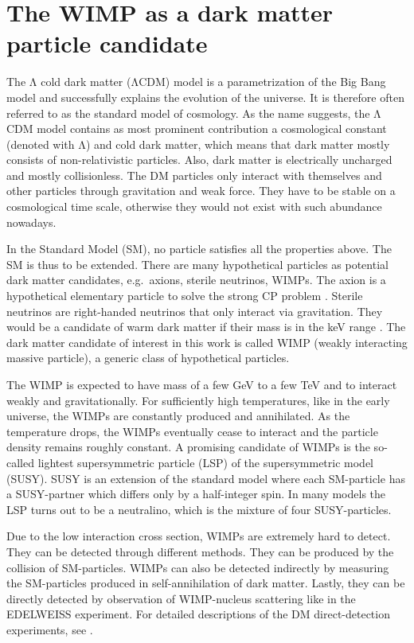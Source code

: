 \section{The WIMP as a dark matter particle candidate}
The $\mathrm{\Lambda}$ cold dark matter ($\mathrm{\Lambda}$CDM) model is a parametrization of the Big Bang model and successfully explains the evolution of the universe. It is therefore often referred to as the standard model of cosmology. As the name suggests, the $\mathrm{\Lambda}$CDM model contains as most prominent contribution a cosmological constant (denoted with $\mathrm{\Lambda}$) and cold dark matter, which means that dark matter mostly consists of non-relativistic particles. Also, dark matter is electrically uncharged and mostly collisionless. The DM particles only interact with themselves and other particles through gravitation and weak force. They have to be stable on a cosmological time scale, otherwise they would not exist with such abundance nowadays.

In the Standard Model (SM), no particle satisfies all the properties above. The SM is thus to be extended. There are many hypothetical particles as potential dark matter candidates, e.g.\ axions, sterile neutrinos, WIMPs. The axion is a hypothetical elementary particle to solve the strong CP problem \cite{Pec77}. Sterile neutrinos are right-handed neutrinos that only interact via gravitation. They would be a candidate of warm dark matter if their mass is in the keV range \cite{Dre13}. The dark matter candidate of interest in this work is called WIMP (weakly interacting massive particle), a generic class of hypothetical particles.

The WIMP is expected to have mass of a few GeV to a few TeV and to interact weakly and gravitationally.  For sufficiently high temperatures, like in the early universe, the WIMPs are constantly produced and annihilated. As the temperature drops, the WIMPs eventually cease to interact and the particle density remains roughly constant. A promising candidate of WIMPs is the so-called lightest supersymmetric particle (LSP) of the supersymmetric model (SUSY). SUSY is an extension of the standard model where each SM-particle has a SUSY-partner which differs only by a half-integer spin. In many models the LSP turns out to be a neutralino, which is the mixture of four SUSY-particles.

Due to the low interaction cross section, WIMPs are extremely hard to detect. They can be detected through different methods. They can be produced by the collision of SM-particles. WIMPs can also be detected indirectly by measuring the SM-particles produced in self-annihilation of dark matter. Lastly, they can be directly detected by observation of WIMP-nucleus scattering like in the EDELWEISS experiment. For detailed descriptions of the DM direct-detection experiments, see \cite{Und15}.

